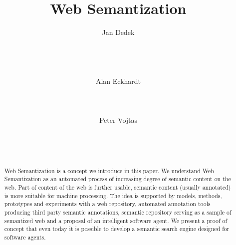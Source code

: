 \documentclass{www2009-submission}
\begin{document}
%
\title{Web Semantization}


\author{
\alignauthor Jan Dedek\\
       \\
       \\
       \\
       \\
\alignauthor Alan Eckhardt\\
       \\
       \\
       \\
\alignauthor Peter Vojtas\\
       \\
       \\
       \\
}

\maketitle
\begin{abstract}
Web Semantization is a concept we introduce in this paper. We understand Web Semantization as an automated process of increasing degree of semantic content on the web. Part of content of the web is further usable, semantic content (usually annotated) is more suitable for machine processing.
The idea is supported by models, methods, prototypes and experiments with a web repository, automated annotation tools producing third party semantic annotations, semantic repository serving as a sample of semantized web and a proposal of an intelligent software agent. We present a proof of concept that even today it is possible to develop a semantic search engine designed for software agents.
\end{abstract}

\end{document}
